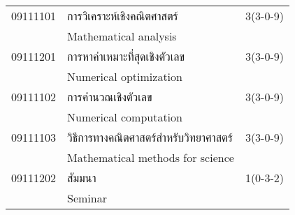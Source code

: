 \begin{longtable}{p{}p{}r{}}
09111101 & การวิเคราะห์เชิงคณิตศาสตร์ & 3(3-0-9)\\
 & Mathematical analysis & \\[1mm]
09111201 & การหาค่าเหมาะที่สุดเชิงตัวเลข & 3(3-0-9)\\
 & Numerical optimization & \\[1mm]
09111102 & การคำนวณเชิงตัวเลข & 3(3-0-9)\\
 & Numerical computation & \\[1mm]
09111103 & วิธีการทางคณิตศาสตร์สำหรับวิทยาศาสตร์ & 3(3-0-9)\\
 & Mathematical methods for science & \\[1mm]
09111202 & สัมมนา & 1(0-3-2)\\
 & Seminar & \\[1mm]
\end{longtable}
